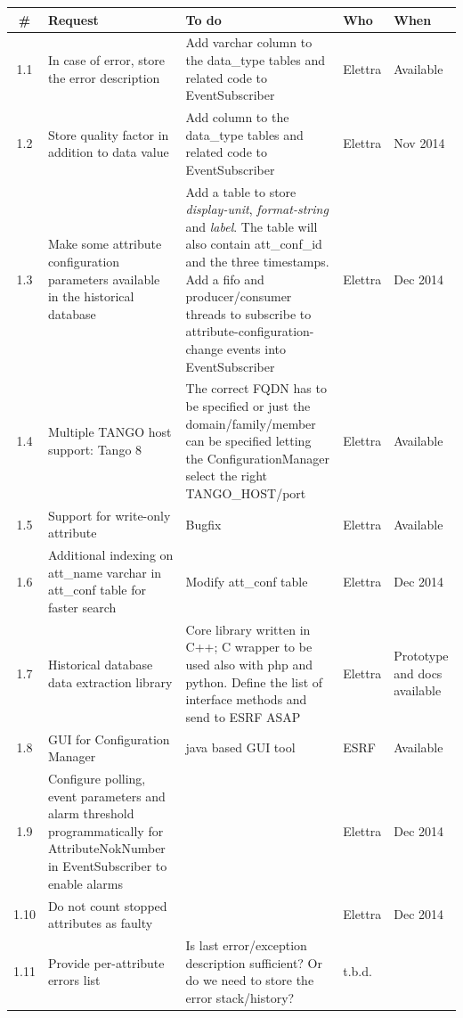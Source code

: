 \documentclass[11pt,a4paper]{article}
\begin{document}
\begin{longtable}{|c|p{6.0cm}|p{6.0cm}|p{1.0cm}|p{1.4cm}|}
	\hline
	\bf{\#} & \bf{Request} & \bf{To do} & \bf{Who} & \bf{When} \\
	\hline
	\endhead
	1.1 &
	In case of error, store the error description &
	Add varchar column to the data\_type tables and related code
	to EventSubscriber &
	Elettra &
	Available \\
	\hline
	1.2 &
	Store quality factor in addition to data value &
	Add column to the data\_type tables and related code
	to EventSubscriber &
	Elettra &
	Nov 2014 \\
	\hline
	1.3 &
	Make some attribute configuration parameters available
	in the historical database &
	Add a table to store \emph{display-unit}, \emph{format-string}
	and \emph{label}. The table will also contain att\_conf\_id and
	the three timestamps.
	Add a fifo and producer/consumer threads to subscribe
	to attribute-configuration-change events into EventSubscriber &
	Elettra &
	Dec 2014 \\
	\hline
	1.4 &
	Multiple TANGO host support: Tango 8 &
	The correct FQDN has to be specified or just the
	domain/family/member can be specified letting the
	ConfigurationManager select the right TANGO\_HOST/port &
	Elettra &
	Available \\
	\hline
	1.5 &
	Support for write-only attribute &
	Bugfix &
	Elettra &
	Available \\
	\hline
	1.6 &
	Additional indexing on att\_name varchar in att\_conf table
	for faster search &
	Modify att\_conf table &
	Elettra &
	Dec 2014 \\
	\hline
	1.7 &
	Historical database data extraction library &
	Core library written in C++; C wrapper to be used
	also with php and python. Define the list of interface methods
	and send to ESRF ASAP &
	Elettra &
	Prototype and docs available \\
	\hline
	1.8 &
	GUI for Configuration Manager &
	java based GUI tool &
	ESRF &
	Available\\
	\hline
	1.9 &
	Configure polling, event parameters and alarm threshold
	programmatically for AttributeNokNumber in EventSubscriber
	to enable alarms &
	&
	Elettra &
	Dec 2014 \\
	\hline
	1.10 &
	Do not count stopped attributes as faulty &
	&
	Elettra &
	Dec 2014 \\
	\hline
	1.11 &
	Provide per-attribute errors list &
	Is last error/exception description sufficient? Or do we need
	to store the error stack/history? &
	t.b.d. &
	\\

\end{longtable}
\end{document}
